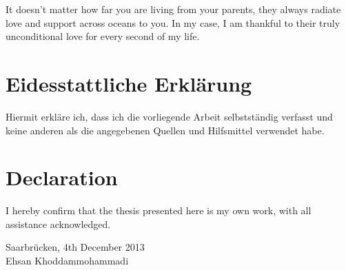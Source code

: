 It doesn't matter how far you are living from your parents, they always radiate
love and support across oceans to you. In my case, I am thankful to their truly
unconditional love for every second of my life. 

\iffalse
Studying in CoLi not only gave me a research direction to work on, but also
gave me the chance to meet my true love, Beata. Working, studying, travelling,
being parents and in one word, living with her is beyond what I could have
expected from life.
Having our daughter together, Lilian, is the magical
experience we are having together. I can't wait for the time that my one
month old daughter is grown to read these lines in future. I write the last line
for her: `` Lilian, you are the most awesome gift ever sent by the God
Almighty.''
\fi




\newpage

\section*{Eidesstattliche Erkl\"{a}rung}
Hiermit erkl\"{a}re ich, dass ich die vorliegende Arbeit selbstst\"{a}ndig
verfasst und keine anderen als die angegebenen Quellen und Hilfsmittel
verwendet habe.

\vspace{2cm}
\section*{Declaration}
I hereby confirm that the thesis presented here is my own work, with all
assistance acknowledged.


\vspace{4cm}
Saarbr\"{u}cken, 4th December 2013\\
Ehsan Khoddammohammadi 

